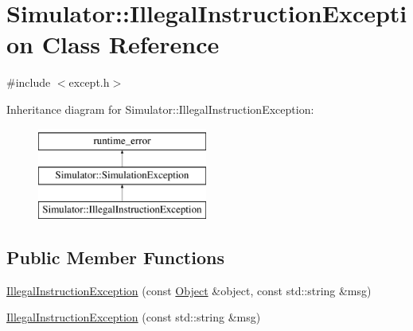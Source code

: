 \hypertarget{class_simulator_1_1_illegal_instruction_exception}{\section{Simulator\+:\+:Illegal\+Instruction\+Exception Class Reference}
\label{class_simulator_1_1_illegal_instruction_exception}
}


{\ttfamily \#include $<$except.\+h$>$}

Inheritance diagram for Simulator\+:\+:Illegal\+Instruction\+Exception\+:\begin{figure}[H]
\begin{center}
\leavevmode
\includegraphics[height=3.000000cm]{class_simulator_1_1_illegal_instruction_exception}
\end{center}
\end{figure}
\subsection*{Public Member Functions}
\begin{DoxyCompactItemize}
\item 
\hyperlink{class_simulator_1_1_illegal_instruction_exception_a27f0b57e47d5541012ee03bf53d46fca}{Illegal\+Instruction\+Exception} (const \hyperlink{class_simulator_1_1_object}{Object} \&object, const std\+::string \&msg)
\item 
\hyperlink{class_simulator_1_1_illegal_instruction_exception_a28ddb2a7fa99a2d76496a7c734404df3}{Illegal\+Instruction\+Exception} (const std\+::string \&msg)
\end{DoxyCompactItemize}


